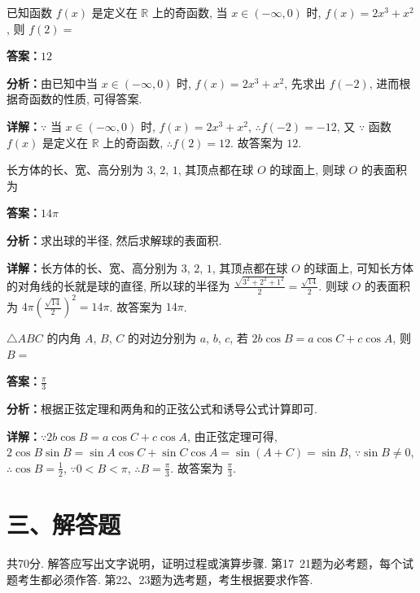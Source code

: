 \begin{question}[points=5]
已知函数 $f(x)$ 是定义在 $\mathbb{R}$ 上的奇函数, 当 $x\in(-\infty,0)$ 时, $f(x)=2x^3+x^2$, 则 $f(2)=$
\fillin[{$12$}]
\begin{solution}
\textbf{答案：}$12$

\textbf{分析：}由已知中当 $x\in(-\infty,0)$ 时, $f(x)=2x^3+x^2$, 先求出 $f(-2)$, 进而根据奇函数的性质, 可得答案.

\textbf{详解：}$\because$ 当 $x\in(-\infty,0)$ 时, $f(x)=2x^3+x^2$, $\therefore f(-2)=-12$, 又 $\because$ 函数 $f(x)$ 是定义在 $\mathbb{R}$ 上的奇函数, $\therefore f(2)=12$. 故答案为 $12$.
\end{solution}
\end{question}

\begin{question}[points=5]
长方体的长、宽、高分别为 $3$, $2$, $1$, 其顶点都在球 $O$ 的球面上, 则球 $O$ 的表面积为
\fillin[{$14\pi$}]
\begin{solution}
\textbf{答案：}$14\pi$

\textbf{分析：}求出球的半径, 然后求解球的表面积.

\textbf{详解：}长方体的长、宽、高分别为 $3$, $2$, $1$, 其顶点都在球 $O$ 的球面上, 可知长方体的对角线的长就是球的直径, 所以球的半径为 $\frac{\sqrt{3^2+2^2+1^2}}{2}=\frac{\sqrt{14}}{2}$. 则球 $O$ 的表面积为 $4\pi\left(\frac{\sqrt{14}}{2}\right)^2=14\pi$. 故答案为 $14\pi$.
\end{solution}
\end{question}

\begin{question}[points=5]
$\triangle ABC$ 的内角 $A$, $B$, $C$ 的对边分别为 $a$, $b$, $c$, 若 $2b\cos B=a\cos C+c\cos A$, 则 $B=$
\fillin[{$\frac{\pi}{3}$}]
\begin{solution}
\textbf{答案：}$\frac{\pi}{3}$

\textbf{分析：}根据正弦定理和两角和的正弦公式和诱导公式计算即可.

\textbf{详解：}$\because 2b\cos B=a\cos C+c\cos A$, 由正弦定理可得, $2\cos B\sin B=\sin A\cos C+\sin C\cos A=\sin(A+C)=\sin B$, $\because \sin B\neq0$, $\therefore \cos B=\frac{1}{2}$, $\because 0<B<\pi$, $\therefore B=\frac{\pi}{3}$. 故答案为 $\frac{\pi}{3}$.
\end{solution}
\end{question}

\section*{三、解答题}
共70分. 解答应写出文字说明，证明过程或演算步骤. 第17~21题为必考题，每个试题考生都必须作答. 第22、23题为选考题，考生根据要求作答.

